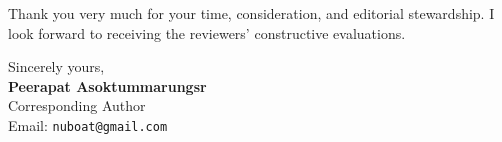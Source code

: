 \documentclass[11pt,a4paper]{article}
\begin{document}
\vspace{2ex}
\noindent Thank you very much for your time, consideration, and editorial stewardship. I look forward to receiving the reviewers' constructive evaluations.

\vspace{2.5ex}
\noindent Sincerely yours,\\[2ex]
\textbf{Peerapat Asoktummarungsr}\\
Corresponding Author\\
Email: \texttt{nuboat@gmail.com}
\end{document}
